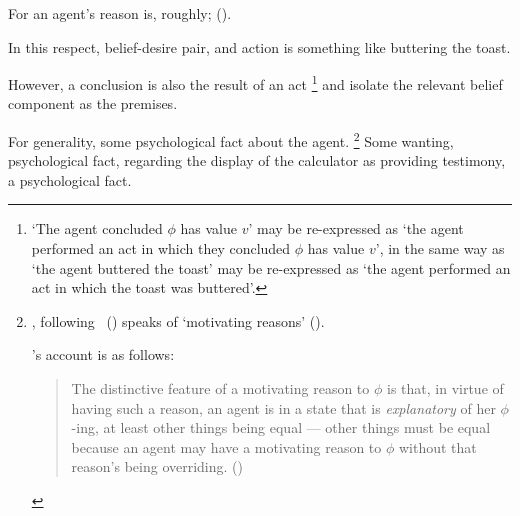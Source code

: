 \begin{note}
  For \citeauthor{Davidson:1963aa} an agent's reason is, roughly;  (\citeyear[685]{Davidson:1963aa}).

  In this respect, belief-desire pair, and action is something like buttering the toast.

  However, a conclusion is also the result of an act%
  \footnote{
    `The agent concluded \(\phi\) has value \(v\)' may be re-expressed as `the agent performed an act in which they concluded \(\phi\) has value \(v\)', in the same way as `the agent buttered the toast' may be re-expressed as `the agent performed an act in which the toast was buttered'.
  }
    and isolate the relevant belief component as the premises.

    For generality, some psychological fact about the agent.%
  \footnote{
    \citeauthor{Hieronymi:2011aa}, following~\citeauthor{Smith:1994wo} (\citeyear{Smith:1994wo}) speaks of `motivating reasons' (\citeyear[411--412]{Hieronymi:2011aa}).

    \citeauthor{Smith:1994wo}'s account is as follows:
    \begin{quote}
      The distinctive feature of a motivating reason to \(\phi\) is that, in virtue of having such a reason, an agent is in a state that is \emph{explanatory} of her \(\phi\)-ing, at least other things being equal --- other things must be equal because an agent may have a motivating reason to \(\phi\) without that reason's being overriding.%
      \mbox{}\hfill\mbox{(\citeyear{Smith:1994wo})}
    \end{quote}
  }
  Some wanting, psychological fact, regarding the display of the calculator as providing testimony, a psychological fact.
\end{note}

